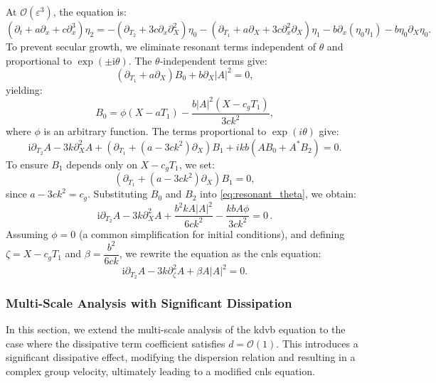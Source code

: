 \documentclass[alpha-refs, 12pt]{wiley-article}
\renewcommand{\O}{\mathcal{O}}
\newcommand{\ui}{\mathrm{i}}
\newcommand{\eps}{\varepsilon}
\begin{document}
At $\O(\eps^3)$, the equation is:
\begin{equation}\label{eq:third_order}
  \left( \partial_t + a \partial_x + c \partial_x^3 \right) \eta_2 = - \left( \partial_{T_2} + 3 c \partial_x \partial_X^2 \right) \eta_0 - \left( \partial_{T_1} + a \partial_X + 3 c \partial_x^2 \partial_X \right) \eta_1 - b \partial_x ( \eta_0 \eta_1 ) - b \eta_0 \partial_X \eta_0.
\end{equation}
To prevent secular growth, we eliminate resonant terms independent of $\theta$ and proportional to $\exp(\pm \ui \theta)$. The $\theta$-independent terms give:
\begin{equation}\label{eq:B0_equation}
  \left( \partial_{T_1} + a \partial_X \right) B_0 + b \partial_X |A|^2 = 0,
\end{equation}
yielding:
\[
  B_0 = \phi(X - a T_1) - \frac{b |A|^2 (X - c_g T_1)}{3 c k^2},
\]
where $\phi$ is an arbitrary function. The terms proportional to $\exp(i \theta)$ give:
\begin{equation}\label{eq:resonant_theta}
  \ui \partial_{T_2} A - 3 k \partial_X^2 A + \left( \partial_{T_1} + (a - 3 c k^2) \partial_X \right) B_1 + i k b \left( A B_0 + A^* B_2 \right) = 0.
\end{equation}
To ensure $B_1$ depends only on $X - c_g T_1$, we set:
\[
\left( \partial_{T_1} + (a - 3 c k^2) \partial_X \right) B_1 = 0,
\]
since $a - 3 c k^2 = c_g$. Substituting $B_0$ and $B_2$ into \eqref{eq:resonant_theta}, we obtain:
\begin{equation*}%
  \ui \partial_{T_2} A - 3 k \partial_X^2 A + \frac{b^2 k A |A|^2}{6 c k^2} - \frac{k b A \phi}{3 c k^2} = 0\,.
\end{equation*}
Assuming $\phi = 0$ (a common simplification for initial conditions), and defining $\zeta = X - c_g T_1$ and $\beta = \dfrac{b^2}{6 c k}$, we rewrite the equation as the \acrshort{cnls} equation:
\begin{equation}\label{eq:NLS_final}
  \ui \partial_{T_2} A - 3 k \partial_\zeta^2 A + \beta A |A|^2 = 0.
\end{equation}

\subsubsection{Multi-Scale Analysis with Significant Dissipation}

In this section, we extend the multi-scale analysis of the \acrshort{kdvb} equation to the case where the dissipative term coefficient satisfies $d = \O(1)$. This introduces a significant dissipative effect, modifying the dispersion relation and resulting in a complex group velocity, ultimately leading to a modified \acrfull{cnls} equation.
\end{document}
